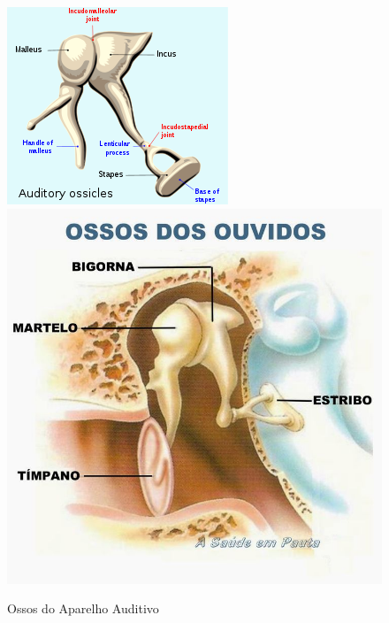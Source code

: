 \documentclass[
]{book}
\begin{document}
\begin{figure}

{\centering \includegraphics[width=0.9\linewidth]{figuras/Aula5-1-ossos-do-aparelho-auditivo} \includegraphics[width=0.9\linewidth]{figuras/Aula5-2-ossos-do-aparelho-audivo} 

}

\caption{Ossos do Aparelho Auditivo}\label{fig:unnamed-chunk-7}
\end{figure}
\end{document}
